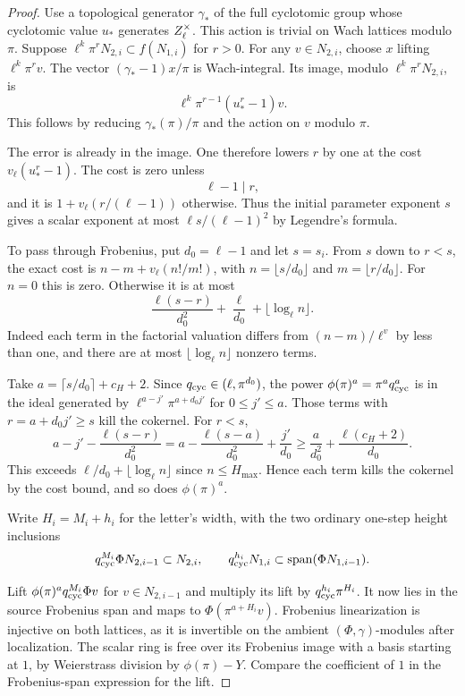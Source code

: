 \begin{proof}
Use a topological generator \(\gamma_*\) of the full
cyclotomic group whose cyclotomic value \(u_*\) generates
\(Z_\ell^\times\). This action is trivial on Wach lattices
modulo \(\pi\). Suppose \(\ell^k\pi^r N_{2,i}\subset f(N_{1,i})\)
for \(r>0\). For any \(v\in N_{2,i}\), choose \(x\) lifting
\(\ell^k\pi^r v\). The vector \((\gamma_*-1)x/\pi\) is
Wach-integral. Its image, modulo \(\ell^k\pi^rN_{2,i}\), is
\[
                   \ell^k\pi^{r-1}(u_*^r-1)v .
\]
This follows by reducing \(\gamma_*(\pi)/\pi\) and the action
on \(v\) modulo \(\pi\).

The error is already in the image.
One therefore lowers \(r\) by one at the cost
\(v_\ell(u_*^r-1)\). The cost is zero unless
\[
 \ell-1\mid r,
\]
and it is \(1+v_\ell(r/(\ell-1))\)
otherwise. Thus the initial parameter exponent \(s\) gives
a scalar exponent at most \(\ell s/(\ell-1)^2\) by
Legendre's formula.

To pass through Frobenius, put \(d_0=\ell-1\) and let
\(s=s_i\). From \(s\) down to \(r<s\), the exact cost is
\(n-m+v_\ell(n!/m!)\), with \(n=\lfloor s/d_0\rfloor\)
and \(m=\lfloor r/d_0\rfloor\). For \(n=0\) this is zero.
Otherwise it is at most
\[
         \frac{\ell(s-r)}{d_0^2}+\frac{\ell}{d_0}
                         +\lfloor\log_\ell n\rfloor .
\]
Indeed each term in the factorial valuation differs from
\((n-m)/\ell^v\) by less than one, and there are at most
\(\lfloor\log_\ell n\rfloor\) nonzero terms.

Take
\(a=\lceil s/d_0\rceil+c_H+2\). Since
\(q_{\rm cyc}\in(\ell,\pi^{d_0})\), the power
\(\phi(\pi)^a=\pi^a q_{\rm cyc}^a\) is in the ideal
generated by \(\ell^{a-j'}\pi^{a+d_0j'}\) for
\(0\le j'\le a\).
Those terms with \(r=a+d_0j'\ge s\) kill the cokernel.
For \(r<s\),
\[
 a-j'-\frac{\ell(s-r)}{d_0^2}
 =a-\frac{\ell(s-a)}{d_0^2}+\frac{j'}{d_0}
 \ge\frac{a}{d_0^2}+\frac{\ell(c_H+2)}{d_0}.
\]
This exceeds \(\ell/d_0+\lfloor\log_\ell n\rfloor\) since
\(n\le H_{\max}\). Hence each term kills the cokernel by
the cost bound, and so does \(\phi(\pi)^a\).

Write \(H_i=M_i+h_i\) for the letter's width, with the two ordinary one-step height inclusions
\[
 q_{\rm cyc}^{M_i}\Phi N_{2,i-1}\subset N_{2,i},\qquad q_{\rm cyc}^{h_i}N_{1,i}\subset\operatorname{span}(\Phi N_{1,i-1}).
\]

Lift \(\phi(\pi)^a q_{\rm cyc}^{M_i}\Phi v\) for
\(v\in N_{2,i-1}\) and multiply its lift by
\(q_{\rm cyc}^{h_i}\pi^{H_i}\).
It now lies in the source Frobenius span and maps to
\(\Phi(\pi^{a+H_i}v)\).
Frobenius linearization is injective on both lattices,
as it is invertible on the ambient \((\Phi,\gamma)\)-modules
after localization. The scalar ring is free over its
Frobenius image with a basis starting at \(1\), by
Weierstrass division by \(\phi(\pi)-Y\).
Compare the coefficient of \(1\) in the Frobenius-span
expression for the lift.


\end{proof}
